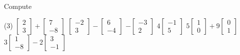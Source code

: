 \documentclass{ximera}
\begin{document}
\begin{exercise}
    Compute
    \begin{tasks}(3)
        \task
        $\begin{bmatrix}
            2 \\
            3 
        \end{bmatrix}
        +
        \begin{bmatrix}
            7 \\
            -8
        \end{bmatrix}$
        \task
        $\begin{bmatrix}
            -2 \\
            3 
        \end{bmatrix}
        -
        \begin{bmatrix}
            6 \\
            -4
        \end{bmatrix}$
        \task
        $-\begin{bmatrix}
            -3 \\
            2 
        \end{bmatrix}$
        \task
        $4\begin{bmatrix}
            -1 \\
            5 
        \end{bmatrix}$
        \task
        $5\begin{bmatrix}
            1 \\
            0 
        \end{bmatrix}
        + 9
        \begin{bmatrix}
            0 \\
            1
        \end{bmatrix}$
        \task
        $3\begin{bmatrix}
            1 \\
            -8 
        \end{bmatrix}
        - 2
        \begin{bmatrix}
            3 \\
            -1
        \end{bmatrix}$
    \end{tasks}
\end{exercise}
\end{document}
